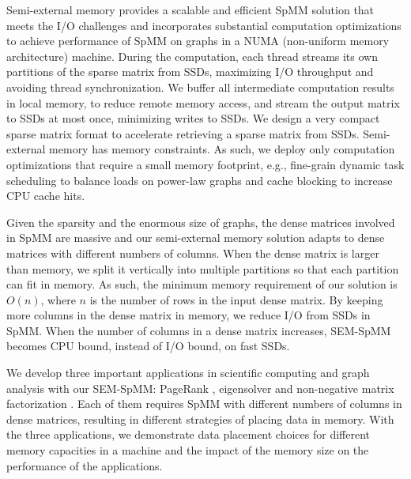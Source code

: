 Semi-external memory provides a scalable and efficient SpMM solution that
meets the I/O challenges and incorporates substantial computation optimizations
to achieve performance of SpMM on graphs in a NUMA (non-uniform memory
architecture) machine. During the computation, each
thread streams its own partitions of the sparse matrix from SSDs, maximizing
I/O throughput and avoiding thread synchronization. We buffer all
intermediate computation results in local memory, to reduce remote memory
access, and stream the output matrix to SSDs at most once, minimizing writes
to SSDs. We design a very compact sparse matrix format to accelerate retrieving
a sparse matrix from SSDs. Semi-external memory has memory constraints.
As such, we deploy only computation optimizations that require a small memory
footprint, e.g., fine-grain dynamic task scheduling to balance loads on
power-law graphs and cache blocking to increase CPU cache hits.

Given the sparsity and the enormous size of graphs, the dense matrices involved
in SpMM are massive and our semi-external memory solution adapts to
dense matrices with different numbers of columns. When the dense matrix is
larger than memory, we split it
vertically into multiple partitions so that each partition can fit in
memory. As such, the minimum memory requirement of our solution is $O(n)$,
where $n$ is the number of rows in the input dense matrix. By keeping more columns
in the dense matrix in memory, we reduce I/O from SSDs in SpMM. When the number
of columns in a dense matrix increases, SEM-SpMM becomes CPU bound, instead of
I/O bound, on fast SSDs.

We develop three important applications in scientific computing and graph
analysis
with our SEM-SpMM: PageRank \cite{pagerank}, eigensolver \cite{anasazi} and
non-negative matrix factorization \cite{nmf}. Each of them requires SpMM with
different numbers of columns in dense matrices, resulting in different
strategies of placing data in memory. With the three applications, we
demonstrate data placement choices for different memory capacities in a machine
and the impact of the memory size on the performance of the applications.


